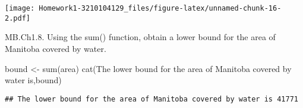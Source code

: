 \documentclass[
]{article}
\newenvironment{Shaded}{\begin{snugshade}}{\end{snugshade}}
\newcommand{\FunctionTok}[1]{\textcolor[rgb]{0.00,0.00,0.00}{#1}}
\newcommand{\NormalTok}[1]{#1}
\newcommand{\OtherTok}[1]{\textcolor[rgb]{0.56,0.35,0.01}{#1}}
\newcommand{\StringTok}[1]{\textcolor[rgb]{0.31,0.60,0.02}{#1}}
\begin{document}
\texttt{[image: Homework1-3210104129\_files/figure-latex/unnamed-chunk-16-2.pdf]}

MB.Ch1.8. Using the sum() function, obtain a lower bound for the area of
Manitoba covered by water.

\begin{Shaded}
\begin{Highlighting}[]
\NormalTok{bound }\OtherTok{\textless{}{-}} \FunctionTok{sum}\NormalTok{(area)}
\FunctionTok{cat}\NormalTok{(}\StringTok{\textquotesingle{}The lower bound for the area of Manitoba covered by water is\textquotesingle{}}\NormalTok{,bound)}
\end{Highlighting}
\end{Shaded}

\begin{verbatim}
## The lower bound for the area of Manitoba covered by water is 41771
\end{verbatim}
\end{document}
